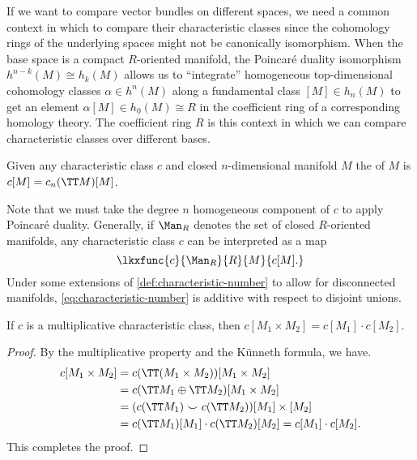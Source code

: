 If we want to compare vector bundles on different spaces, we need a common context in which to compare their characteristic classes since the cohomology rings of the underlying spaces might not be canonically isomorphism. When the base space is a compact $R$-oriented manifold, the Poincar\'e duality isomorphism $h^{n-k}(M) \cong h_k(M)$ allows us to ``integrate'' homogeneous top-dimensional cohomology classes $\alpha\in h^{n}(M)$ along a fundamental class $[M]\in h_n(M)$ to get an element $\alpha[M]\in h_0(M)\cong R$ in the coefficient ring of a corresponding homology theory. The coefficient ring $R$ is this context in which we can compare characteristic classes over different bases.

\begin{definition}\label{def:characteristic-number}
	Given any characteristic class $c$ and closed $n$-dimensional manifold $M$ the  of $M$ is $c[M] = c_n(\TT M)[M]$.
\end{definition}

Note that we must take the degree $n$ homogeneous component of $c$ to apply Poincar\'e duality. Generally, if $\Man_R$ denotes the set of closed $R$-oriented manifolds, any characteristic class $c$ can be interpreted as a map
\begin{equation}\label{eq:characteristic-number}
	\lkxfunc{c}{\Man_R}{R}{M}{c[M].}
\end{equation}
Under some extensions of \cref{def:characteristic-number} to allow for disconnected manifolds, \cref{eq:characteristic-number} is additive with respect to disjoint unions.
\begin{proposition}
	If $c$ is a multiplicative characteristic class, then $c[M_1\times M_2]=c[M_1]\cdot c[M_2]$.
\end{proposition}
\begin{proof}
	By the multiplicative property and the K\"unneth formula, we have.
	\[
		\begin{aligned}
			c[M_1\times M_2]
			 & = c(\TT (M_1\times M_2))[M_1\times M_2]                      \\
			 & = c(\TT M_1\oplus \TT M_2)[M_1\times M_2]                    \\
			 & = (c(\TT M_1)\smile c(\TT M_2))[M_1]\times [M_2]             \\
			 & = c(\TT M_1)[M_1]\cdot c(\TT M_2)[M_2] = c[M_1]\cdot c[M_2].
		\end{aligned}
	\]
	This completes the proof.
\end{proof}

